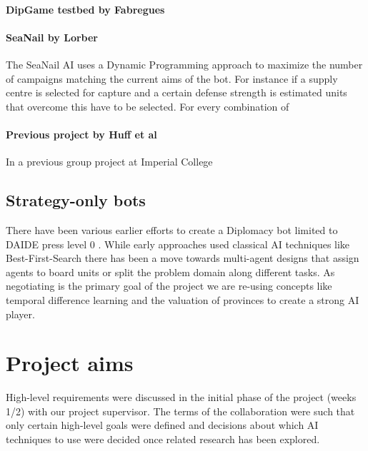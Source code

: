 \documentclass[pdftex,12pt,a4paper]{report}
\begin{document}
\paragraph{DipGame testbed by Fabregues}

\paragraph{SeaNail by Lorber}

The SeaNail AI \cite{Lorber98} uses a Dynamic Programming approach to
maximize the number of campaigns matching the current aims of the
bot. For instance if a supply centre is selected for capture and a
certain defense strength is estimated units that overcome this have to
be selected. For every combination of

\paragraph{Previous project by Huff et al}

In a previous group project at Imperial College \cite{Huff05}

\subsection{Strategy-only bots}

There have been various earlier efforts to create a Diplomacy bot
limited to DAIDE press level 0 \cite{DAIDEsyntax10}. While early
approaches used classical AI techniques like Best-First-Search there
has been a move towards multi-agent designs that assign agents to
board units or split the problem domain along different tasks. As
negotiating is the primary goal of the project we are re-using
concepts like temporal difference learning \cite{Levinson94} and the
valuation of provinces \cite{Huff05} to create a strong AI player.


\pagebreak

\section{Project aims}

High-level requirements were discussed in the initial phase of the
project (weeks 1/2) with our project supervisor. The terms of the
collaboration were such that only certain high-level goals were
defined and decisions about which AI techniques to use were decided once
related research has been explored.
\end{document}
